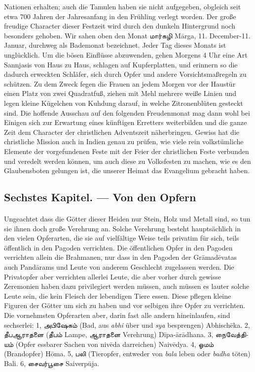\documentclass{article}
\newcommand{\TamilText}[1]{\texttamil{#1}}
\newcommand{\tam}[1]{\TamilText{#1}}
\begin{document}
Nationen erhalten; auch die Tamulen haben sie nicht aufgegeben, obgleich seit etwa 700 Jahren der Jahresanfang in den Frühling verlegt worden. Der große freudige Character dieser Festzeit wird durch den dunkeln Hintergrund noch besonders gehoben. Wir sahen oben den Monat \tam{மார்கழி} M\={a}rga, 11. December-11. Januar, durchweg als Bademonat bezeichnet. Jeder Tag dieses Monats ist unglücklich. Um die bösen Einflüsse abzuwenden, gehen Morgens 4 Uhr eine Art Sannjasis von Haus zu Haus, schlagen auf Kupferplatten, und erinnern so die dadurch erweckten Schläfer, sich durch Opfer und andere Vorsichtsmaßregeln zu schützen. Zu dem Zweck fegen die Frauen an jedem Morgen vor der Haustür einen Platz von zwei Quadratfuß, ziehen mit Mehl mehrere weiße Linien und legen kleine Kügelchen von Kuhdung darauf, in welche Zitronenblüten gesteckt sind. Die hoffende Ausschau auf den folgenden Freudenmonat mag dann wohl bei Einigen sich zur Erwartung eines künftigen Erretters weiterbilden und die ganze Zeit dem Character der christlichen Adventszeit näherbringen. Gewiss hat die christliche Mission auch in Indien genau zu prüfen, wie viele rein volkstümliche Elemente der vorgefundenen Feste mit der Feier der christlichen Feste verbunden und veredelt werden können, um auch diese zu Volksfesten zu machen, wie es den Glaubensboten gelungen ist, die unserer Heimat das Evangelium gebracht haben.

\clearpage
\subsection{Sechstes Kapitel. — Von den Opfern}
\paragraph{}
Ungeachtet dass die Götter dieser Heiden nur Stein, Holz und Metall sind, so tun sie ihnen doch große Verehrung an. Solche Verehrung besteht hauptsächlich in den vielen Opferarten, die sie auf vielfältige Weise teils privatim für sich, teils öffentlich in den Pagoden verrichten. Die öffentlichen Opfer in den Pagoden verrichten allein die Brahmanen, nur dass in den Pagoden der Gr\={a}mad\={e}vatas auch Pand\={a}rams und Leute von anderem Geschlecht zugelassen werden. Die Privatopfer aber verrichten allerlei Leute, die aber vorher durch gewisse Zeremonien haben dazu privilegiert werden müssen, auch müssen es lauter solche Leute sein, die kein Fleisch der lebendigen Tiere essen. Diese pflegen kleine Figuren der Götter um sich zu haben und vor selbigen ihre Opfer zu verrichten. Die vornehmsten Opferarten aber, darin fast alle andern hineinlaufen, sind sechserlei: 1, \tam{அபிஷேகம்} (Bad, aus \emph{abhi} über und \emph{sya} besprengen) Abhisch\={e}ka. 2, \tam{தீபஆராதனை} (\tam{தீபம்} Lampe, \tam{ஆராதனை} Verehrung) D\={i}pa-\={a}r\={a}dhana. 3, \tam{நைவேத்தியம்} (Opfer essbarer Sachen von niv\={e}da darreichen) Naiv\={e}dya. 4, \tam{ஓமம்} (Brandopfer) H\={o}ma. 5, \tam{பலி} (Tieropfer, entweder von \emph{bala} leben oder \emph{badha} töten) Bali. 6, \tam{சைவர்பூசை} Saiverp\={u}ja.
\end{document}
